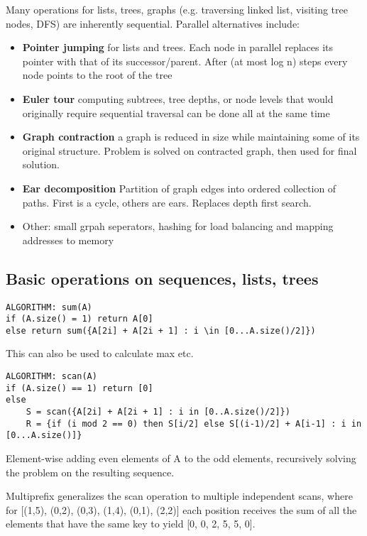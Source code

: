 Many operations for lists, trees, graphs (e.g. traversing linked list, visiting tree nodes, DFS) are inherently sequential. Parallel alternatives include:

\begin{itemize}
    \item \textbf{Pointer jumping} for lists and trees. Each node in parallel replaces its pointer with that of its successor/parent. After (at most log n) steps every node points to the root of the tree
    \item \textbf{Euler tour} computing subtrees, tree depths, or node levels that would originally require sequential traversal can be done all at the same time
    \item \textbf{Graph contraction} a graph is reduced in size while maintaining some of its original structure. Problem is solved on contracted graph, then used for final solution. 
    \item \textbf{Ear decomposition} Partition of graph edges into ordered collection of paths. First is a cycle, others are ears. Replaces depth first search.
    \item Other: small grpah seperators, hashing for load balancing and mapping addresses to memory
\end{itemize}

\subsection{Basic operations on sequences, lists, trees}

\begin{lstlisting}
ALGORITHM: sum(A)
if (A.size() = 1) return A[0]
else return sum({A[2i] + A[2i + 1] : i \in [0...A.size()/2]})
\end{lstlisting}

This can also be used to calculate max etc. 

\begin{lstlisting}
ALGORITHM: scan(A)
if (A.size() == 1) return [0]
else 
    S = scan({A[2i] + A[2i + 1] : i in [0..A.size()/2]})
    R = {if (i mod 2 == 0) then S[i/2] else S[(i-1)/2] + A[i-1] : i in [0...A.size()]}
\end{lstlisting}

Element-wise adding even elements of A to the odd elements, recursively solving the problem on the resulting sequence. 

Multiprefix generalizes the scan operation to multiple independent scans, where for [(1,5), (0,2), (0,3), (1,4), (0,1), (2,2)] each position receives the sum of all the elements that have the same key to yield [0, 0, 2, 5, 5, 0].

